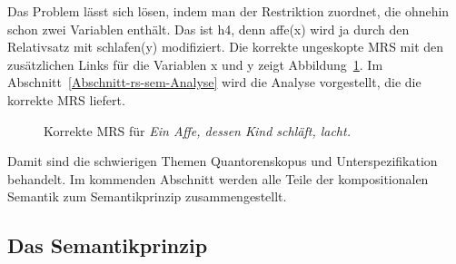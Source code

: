 %

Das Problem lässt sich lösen, indem man  der Restriktion zuordnet, die ohnehin schon zwei
Variablen enthält. Das ist h4, denn affe(x) wird ja durch den Relativsatz mit schlafen(y)
modifiziert. Die korrekte ungeskopte MRS mit den zusätzlichen Links für die Variablen x und y zeigt Abbildung~\ref{Abbildung dessen Kind}.
Im Abschnitt~\ref{Abschnitt-rs-sem-Analyse} wird die Analyse vorgestellt, die die korrekte MRS
liefert. 
\begin{figure}
\caption{Korrekte MRS für \emph{Ein Affe, dessen Kind schläft, lacht.}}\label{Abbildung dessen Kind}
\end{figure}


Damit sind die schwierigen Themen Quantorenskopus und Unterspezifikation behandelt. Im kommenden
Abschnitt werden alle Teile der kompositionalen Semantik zum Semantikprinzip zusammengestellt.

\subsection{Das Semantikprinzip}
\label{Abschnitt-Semantikprinzip}

